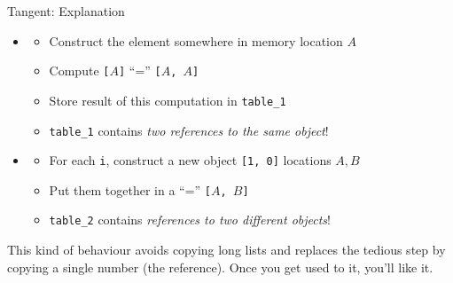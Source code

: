 
\begin{frame}{Tangent: Explanation}
%
\begin{itemize}
\item {}
	\begin{itemize}
	\item Construct the element \inPy{[[1, 0]]} somewhere in memory \Thus location $A$
	\item Compute \texttt{[$A$]}  \enquote{=} \texttt{[$A$, $A$]}
	\item Store result of this computation in \texttt{table\_1}
	\item[\Thus] \texttt{table\_1} contains \emph{two references to the same object}! 
	\end{itemize}
\item {}
	\begin{itemize}
	\item For each \texttt{i}, construct a new object \texttt{[1, 0]} \Thus locations $A, B$
	\item Put them together in a  \enquote{=} \texttt{[$A$, $B$]}
	\item[\Thus] \texttt{table\_2} contains \emph{references to two different objects}! 
	\end{itemize}
\end{itemize}
%
\begin{hintbox}
This kind of behaviour avoids copying long lists and replaces the tedious step by copying a single number (the reference). Once you get used to it, you'll like it.
\end{hintbox}
%
\end{frame}


